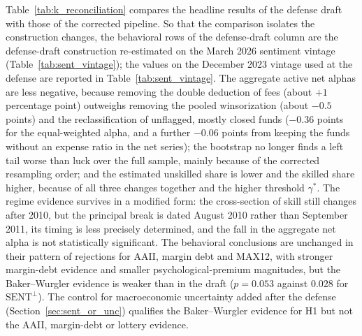 \documentclass[12pt, oneside]{report}
\begin{document}
\noindent Table~\ref{tab:k_reconciliation} compares the headline results
of the defense draft with those of the corrected pipeline. So that the
comparison isolates the construction changes, the behavioral rows of the
defense-draft column are the defense-draft construction re-estimated on
the March 2026 sentiment vintage (Table~\ref{tab:sent_vintage}); the
values on the December 2023 vintage used at the defense are reported in
Table~\ref{tab:sent_vintage}. The
aggregate active net alphas are less negative, because removing the double
deduction of fees (about $+1$ percentage point) outweighs removing the
pooled winsorization (about $-0.5$ points) and the reclassification of
unflagged, mostly closed funds ($-0.36$ points for the equal-weighted
alpha, and a further $-0.06$ points from keeping the funds without an
expense ratio in the net series); the bootstrap no longer finds a left tail worse
than luck over the full sample, mainly because of the corrected
resampling order; and the estimated unskilled share is lower and the
skilled share higher, because of all three changes together and the
higher threshold $\gamma^*$. The regime evidence survives in a modified
form: the cross-section of skill still changes after 2010, but the
principal break is dated August 2010 rather than September 2011, its
timing is less precisely determined, and the fall in the aggregate net
alpha is not statistically significant. The behavioral conclusions are unchanged in
their pattern of rejections for AAII, margin debt and MAX12, with
stronger margin-debt evidence and smaller psychological-premium
magnitudes, but the Baker--Wurgler evidence is weaker than in the draft
($p = 0.053$ against $0.028$ for $\text{SENT}^{\perp}$). The control for macroeconomic
uncertainty added after the defense
(Section~\ref{sec:sent_or_unc}) qualifies the Baker--Wurgler evidence for H1 but
not the AAII, margin-debt or lottery evidence.
\end{document}

